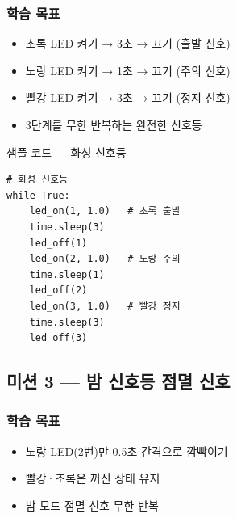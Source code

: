 \begin{storybox}
\end{storybox}

\subsubsection*{학습 목표}
\begin{itemize}[leftmargin=1.4em]
  \item 초록 LED 켜기 → 3초 → 끄기 (출발 신호)
  \item 노랑 LED 켜기 → 1초 → 끄기 (주의 신호)
  \item 빨강 LED 켜기 → 3초 → 끄기 (정지 신호)
  \item 3단계를 무한 반복하는 완전한 신호등
\end{itemize}

\begin{labbox}{샘플 코드 --- 화성 신호등}
\begin{verbatim}
# 화성 신호등
while True:
    led_on(1, 1.0)   # 초록 출발
    time.sleep(3)
    led_off(1)
    led_on(2, 1.0)   # 노랑 주의
    time.sleep(1)
    led_off(2)
    led_on(3, 1.0)   # 빨강 정지
    time.sleep(3)
    led_off(3)
\end{verbatim}
\end{labbox}

\subsection{미션 3 --- 밤 신호등 점멸 신호}
\label{subsec:ch05-m3}

\begin{storybox}
\end{storybox}

\subsubsection*{학습 목표}
\begin{itemize}[leftmargin=1.4em]
  \item 노랑 LED(2번)만 0.5초 간격으로 깜빡이기
  \item 빨강·초록은 꺼진 상태 유지
  \item 밤 모드 점멸 신호 무한 반복
\end{itemize}

